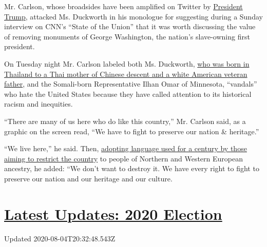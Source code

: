 Mr. Carlson, whose broadsides have been amplified on Twitter by
\href{https://www.nytimes.com/interactive/2020/us/elections/donald-trump.html}{President
Trump}, attacked Ms. Duckworth in his monologue for suggesting during a
Sunday interview on CNN's ``State of the Union'' that it was worth
discussing the value of removing monuments of George Washington, the
nation's slave-owning first president.

On Tuesday night Mr. Carlson labeled both Ms. Duckworth,
\href{https://www.nytimes.com/2020/06/25/us/politics/tammy-duckworth-vice-president-joe-biden.html}{who
was born in Thailand to a Thai mother of Chinese descent and a white
American veteran father}, and the Somali-born Representative Ilhan Omar
of Minnesota, ``vandals'' who hate the United States because they have
called attention to its historical racism and inequities.

``There are many of us here who do like this country,'' Mr. Carlson
said, as a graphic on the screen read, ``We have to fight to preserve
our nation \& heritage.''

``We live here,'' he said. Then,
\href{https://www.nytimes.com/2020/04/10/sunday-review/coronavirus-asian-racism.html}{adopting
language used for a century by those aiming to restrict the country} to
people of Northern and Western European ancestry, he added: ``We don't
want to destroy it. We have every right to fight to preserve our nation
and our heritage and our culture.

\hypertarget{latest-updates-2020-election}{%
\section{\texorpdfstring{\href{https://www.nytimes.com/2020/08/04/us/elections/primary-election-michigan-arizona-kansas.html?action=click\&pgtype=Article\&state=default\&region=MAIN_CONTENT_1\&context=storylines_live_updates}{Latest
Updates: 2020
Election}}{Latest Updates: 2020 Election}}\label{latest-updates-2020-election}}

Updated 2020-08-04T20:32:48.543Z

